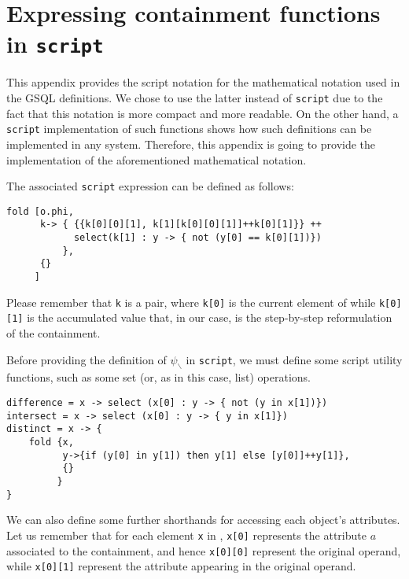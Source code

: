 \chapter{Expressing containment functions in \texttt{script}}\label{app:scriptnote}

This appendix provides the script notation for the mathematical notation used in the GSQL definitions. We chose to use the latter instead of \texttt{script} due to the fact that this notation is more compact and more readable. On the other hand, a \texttt{script} implementation of such functions shows how such definitions can be implemented in any system. Therefore, this appendix is going to provide the implementation of the aforementioned mathematical notation.


The associated \texttt{script} expression can be defined as follows: 
\begin{lstlisting}[language=script]
fold [o.phi,
      k-> { {{k[0][0][1], k[1][k[0][0][1]]++k[0][1]}} ++ 
            select(k[1] : y -> { not (y[0] == k[0][1])})
          },
      {}
     ] 
\end{lstlisting}
Please remember that \texttt{k} is a pair, where \texttt{k[0]} is the current element of  while \texttt{k[0][1]} is the accumulated value that, in our case, is the step-by-step reformulation of the containment.


Before providing the definition of $\psi_\backslash$ in \texttt{script}, we must define some script utility functions, such as some set (or, as in this case, list) operations. 

\begin{lstlisting}[language=script]
difference = x -> select (x[0] : y -> { not (y in x[1])})
intersect = x -> select (x[0] : y -> { y in x[1]})
distinct = x -> {
	fold {x,
	      y->{if (y[0] in y[1]) then y[1] else [y[0]]++y[1]},
	      {}
	     }
}
\end{lstlisting}

We can also define some further shorthands for accessing each object's attributes. Let us remember that for each element \texttt{x} in , \texttt{x[0]} represents the attribute $a$ associated to the containment, and hence \texttt{x[0][0]} represent the original operand, while \texttt{x[0][1]} represent the attribute appearing in the original operand. 

